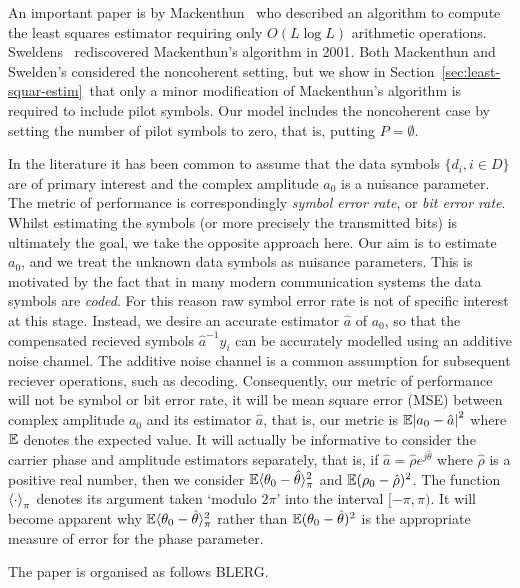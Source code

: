 \documentclass[journal]{IEEEtran}
\begin{document}
An important paper is by Mackenthun~\cite{Mackenthun1994} who described an algorithm to compute the least squares estimator requiring only $O(L \log L)$ arithmetic operations.  Sweldens~\cite{Sweldens2001} rediscovered Mackenthun's algorithm in 2001.  Both Mackenthun and Swelden's considered the noncoherent setting, but we show in Section~\ref{sec:least-squar-estim}~that only a minor modification of Mackenthun's algorithm is required to include pilot symbols. Our model includes the noncoherent case by setting the number of pilot symbols to zero, that is, putting $P = \emptyset$.  

In the literature it has been common to assume that the data symbols $\{d_i, i \in D\}$ are of primary interest and the complex amplitude $a_0$ is a nuisance parameter.  The metric of performance is correspondingly \emph{symbol error rate}, or \emph{bit error rate}.  Whilst estimating the symbols (or more precisely the transmitted bits) is ultimately the goal, we take the opposite approach here.  Our aim is to estimate $a_0$, and we treat the unknown data symbols as nuisance parameters.  This is motivated by the fact that in many modern communication systems the data symbols are \emph{coded}.  For this reason raw symbol error rate is not of specific interest at this stage.  Instead, we desire an accurate estimator $\hat{a}$ of $a_0$, so that the compensated recieved symbols $\hat{a}^{-1}y_i$ can be accurately modelled using an additive noise channel.  The additive noise channel is a common assumption for subsequent reciever operations, such as decoding.  Consequently, our metric of performance will not be symbol or bit error rate, it will be mean square error (MSE) between complex amplitude $a_0$ and its estimator $\hat{a}$, that is, our metric is ${\mathbb E}{\left\vert a_0 - \hat{a} \right\vert}^2$ where ${\mathbb E}$ denotes the expected value. It will actually be informative to consider the carrier phase and amplitude estimators separately, that is, if $\hat{a} = \hat{\rho}e^{j\hat{\theta}}$ where $\hat{\rho}$ is a positive real number, then we consider ${\mathbb E}\langle\theta_0 - \hat{\theta}\rangle_\pi^2$ and ${\mathbb E}(\rho_0 - \hat{\rho})^2$.  The function $\left\langle \cdot \right\rangle_\pi$ denotes its argument taken `modulo $2\pi$' into the interval $[-\pi, \pi)$.  It will become apparent why ${\mathbb E}\langle\theta_0 - \hat{\theta}\rangle_\pi^2$ rather than ${\mathbb E}(\theta_0 - \hat{\theta})^2$ is the appropriate measure of error for the phase parameter.

The paper is organised as follows BLERG.
\end{document}
